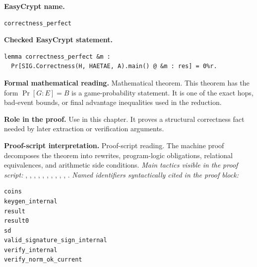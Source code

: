 \begin{formaltheorem}
\noindent\textbf{EasyCrypt name.}
\begin{lstlisting}[language=EasyCrypt,basicstyle=\ttfamily\scriptsize]
correctness_perfect
\end{lstlisting}
\noindent\textbf{Checked EasyCrypt statement.}
\begin{lstlisting}[language=EasyCrypt,basicstyle=\ttfamily\scriptsize]
lemma correctness_perfect &m :
  Pr[SIG.Correctness(H, HAETAE, A).main() @ &m : res] = 0%r.
\end{lstlisting}
\noindent\textbf{Formal mathematical reading.}
Mathematical theorem. This theorem has the form \(\Pr[G:E] = B\) is a game-probability statement.  It is one of the exact hops, bad-event bounds, or final advantage inequalities used in the reduction.

\noindent\textbf{Role in the proof.}
Use in this chapter. It proves a structural correctness fact needed by later extraction or verification arguments.

\noindent\textbf{Proof-script interpretation.}
Proof-script reading. The machine proof decomposes the theorem into rewrites, program-logic obligations, relational equivalences, and arithmetic side conditions.
\emph{Main tactics visible in the proof script:} , , , , , , , , , , .
\emph{Named identifiers syntactically cited in the proof block:}
\begin{lstlisting}[language=EasyCrypt,basicstyle=\ttfamily\scriptsize]
coins
keygen_internal
result
result0
sd
valid_signature_sign_internal
verify_internal
verify_norm_ok_current
\end{lstlisting}

\end{formaltheorem}

